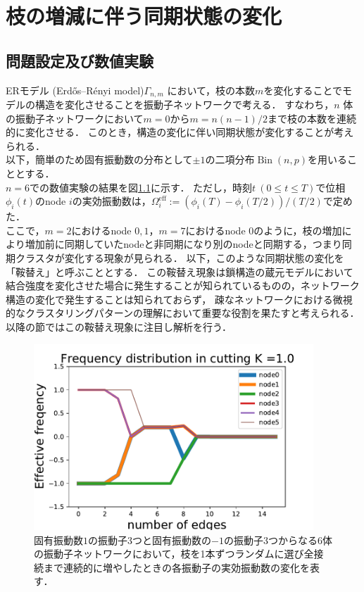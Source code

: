 \documentclass[../main]{subfiles}
\begin{document}
\chapter{枝の増減に伴う同期状態の変化}
\label{chap:method-3body}
\section{問題設定及び数値実験}
\label{sec:method-3body-settting}
ERモデル (Erdős–Rényi model)$\Gamma_{n,m}$ において，枝の本数$m$を変化することでモデルの構造を変化させることを振動子ネットワークで考える．
すなわち，$n$ 体の振動子ネットワークにおいて$m=0$から$m=n(n-1)/2$まで枝の本数を連続的に変化させる．
このとき，構造の変化に伴い同期状態が変化することが考えられる．\\
以下，簡単のため固有振動数の分布として$\pm 1$の二項分布$\operatorname{Bin}(n,p)$を用いることとする．\\
$n=6$での数値実験の結果を図\ref{fig:cutting_N6K1}に示す．
ただし，時刻$t\ (0\leq t\leq T)$で位相$\phi_i(t)$のnode $i$の実効振動数は，$\Omega_i^{\mathrm{eff}}:=(\phi_i(T)-\phi_i(T/2))/(T/2)$で定めた．\\
ここで，$m=2$におけるnode $0,1$，$m=7$におけるnode $0$のように，枝の増加により増加前に同期していたnodeと非同期になり別のnodeと同期する，つまり同期クラスタが変化する現象が見られる．
以下，このような同期状態の変化を「鞍替え」と呼ぶこととする．
この鞍替え現象は鎖構造の蔵元モデルにおいて結合強度を変化させた場合に発生することが知られている\cite{XiaHuang:130506}ものの，ネットワーク構造の変化で発生することは知られておらず，
疎なネットワークにおける微視的なクラスタリングパターンの理解において重要な役割を果たすと考えられる．
以降の節ではこの鞍替え現象に注目し解析を行う．
\begin{figure}[t]
\centering
\includegraphics[width=105mm]{./images/cutting_N6K1.pdf}
\centering
\caption{固有振動数$1$の振動子3つと固有振動数の$-1$の振動子3つからなる6体の振動子ネットワークにおいて，枝を1本ずつランダムに選び全接続まで連続的に増やしたときの各振動子の実効振動数の変化を表す．}
\label{fig:cutting_N6K1}
\end{figure}
\end{document}
